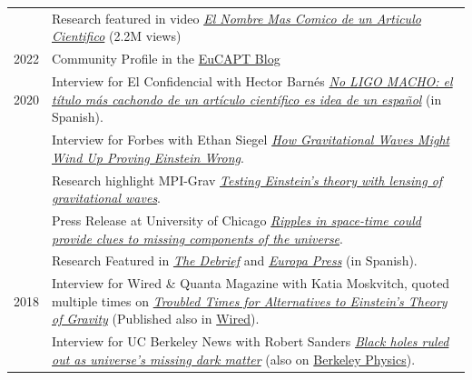 \documentclass[11pt,a4paper]{article}
\begin{document}
\begin{longtable}{c p{15cm}}
& Research featured in video \href{https://www.youtube.com/watch?v=H-nGZCdNuRQ}{\textit{El Nombre Mas Comico de un Articulo Cientifico}} (2.2M views)  \\[2pt]
2022 & {Community Profile} in the \href{https://www.eucapt.org/post/community-profile-miguel-zumalacarregui}{EuCAPT Blog} \\[2pt]
2020 & {Interview for El Confidencial} with Hector Barn\'es \href{https://www.elconfidencial.com/tecnologia/ciencia/2020-01-18/no-ligo-macho-articulo-cientifico-zumalacarregui_2411428/}{\textit{No LIGO MACHO: el t\'itulo m\'as cachondo de un art\'iculo cient\'ifico es idea de un espa\~nol}} (in Spanish).
\\[2pt]
 & {Interview for Forbes} with Ethan Siegel \href{https://www.forbes.com/sites/startswithabang/2020/12/24/how-gravitational-waves-might-wind-up-proving-einstein-wrong/?sh=149999106845}{\textit{How Gravitational Waves Might Wind Up Proving Einstein Wrong}}.
 \\[2pt]
 & {Research highlight MPI-Grav} \href{https://www.aei.mpg.de/597240/testing-einstein-s-theory-with-lensing-of-gravitational-waves}{\textit{Testing Einstein's theory with lensing of gravitational waves}}.
\\[2pt]
 & {Press Release at University of Chicago} \href{https://news.uchicago.edu/story/ripples-space-time-could-provide-clues-missing-components-universe}{\textit{Ripples in space-time could provide clues to missing components of the universe}}. 
\\[2pt]
 & {Research Featured} in \href{https://thedebrief.org/gravitational-waves-offer-clues-to-a-longstanding-cosmic-mystery/}{\textit{The Debrief}}
 and \href{https://www.europapress.es/ciencia/astronomia/noticia-encontrar-piezas-faltan-comprension-universo-20201228165225.html}{\textit{Europa Press}} (in Spanish). 
\\[2pt]
2018 & {Interview for Wired \& Quanta Magazine} with Katia Moskvitch, quoted multiple times on \href{https://www.quantamagazine.org/troubled-times-for-alternatives-to-einsteins-theory-of-gravity-20180430/}{\textit{Troubled Times for Alternatives to Einstein's Theory of Gravity}} (Published also in \href{https://www.wired.com/story/troubled-times-for-alternatives-to-einsteins-theory-of-gravity/}{Wired}).
\\[2pt]
& {Interview for UC Berkeley News} with Robert Sanders \href{http://news.berkeley.edu/2018/10/02/black-holes-ruled-out-as-universes-missing-dark-matter/}{\textit{Black holes ruled out as universe's missing dark matter}} (also on \href{http://physics.berkeley.edu/news-events/news/20181002/black-holes-ruled-out-as-universes-missing-dark-matter}{Berkeley Physics}).

\end{longtable}
\end{document}
